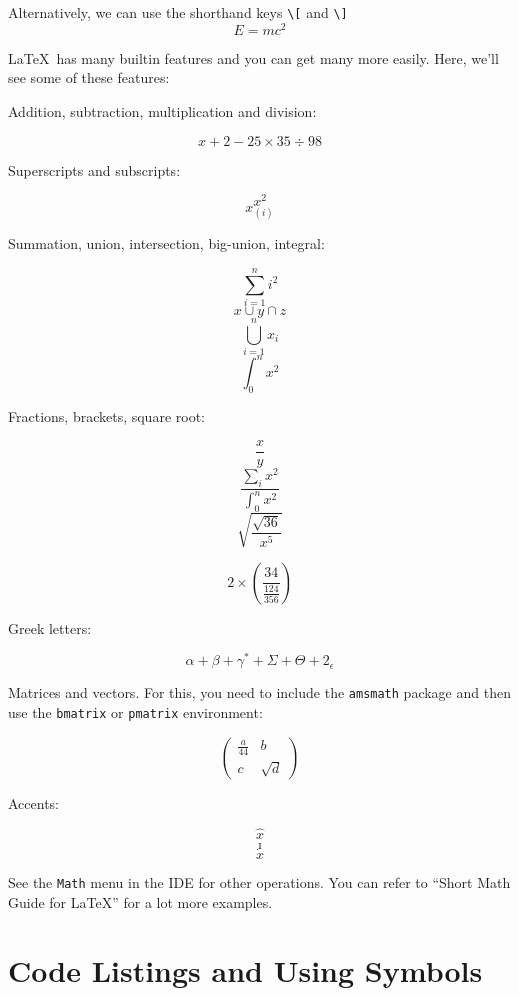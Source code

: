 \documentclass{beamer}
\begin{document}
Alternatively, we can use the shorthand keys \Verb|\[| and \Verb|\]|
\[
E=mc^2
\]


\LaTeX\ has many builtin features and you can get many more easily. Here, we'll see some of these features: 

Addition, subtraction, multiplication and division: 

\[
x+2 - 25 \times 35 \div 98 
\]

Superscripts and subscripts: 

\[ x^2  \]
\[ x_{(i)} \]

Summation, union, intersection, big-union, integral: 

\[ \sum_{i=1}^{n}{i^2} \]
\[ x \cup y \cap z \]
\[ \bigcup_{i=1}^{n}{x_i} \]
\[ \int_0^n{x^2} \]


\begin{frame}
Fractions, brackets, square root: 

\[ \frac{x}{y} \]
\[ \frac{\sum_i{x^2}}{\int_0^n{x^2}} \]
\[ \sqrt{\frac{\sqrt{36}} {x^5}} \]

\[ 2 \times \left( \frac{34}{\frac{124}{356}}    \right)  \]
\end{frame}

\begin{frame}
Greek letters: 

\[
\alpha + \beta + \gamma^* + \Sigma + \Theta + 2_\epsilon 
\]

Matrices and vectors. For this, you need to include the \texttt{amsmath} package and then use the \texttt{bmatrix} or \texttt{pmatrix} environment: 

\[
\begin{pmatrix}
\frac{a}{44} & b \\ 
c & \sqrt{d} 	
\end{pmatrix}
\]

Accents: 

\[ \hat{x} \]
\[ \hat{\imath} \] 
\[ \dot{x} \]
\end{frame}

\begin{frame}
See the \texttt{Math} menu in the IDE for other operations. You can refer to ``Short Math Guide for \LaTeX'' for a lot more examples. 
\end{frame}



\section{Code Listings and Using Symbols}
\end{document}
